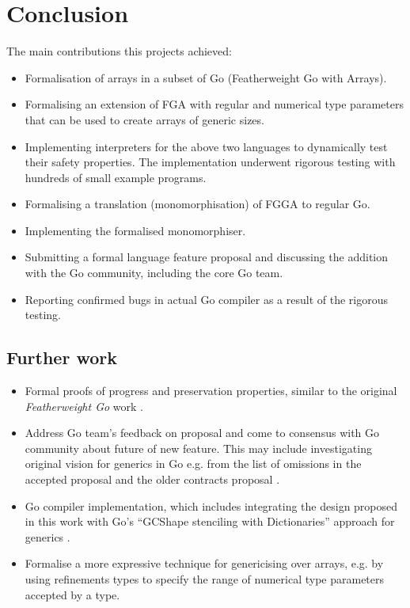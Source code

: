 \section{Conclusion}

The main contributions this projects achieved:

\begin{itemize}
      \item Formalisation of arrays in a subset of Go (Featherweight Go with
            Arrays).
      \item Formalising an extension of FGA with regular and numerical type
            parameters that can be used to create arrays of generic sizes.
      \item Implementing interpreters for the above two languages to dynamically
            test their safety properties. The implementation underwent rigorous
            testing with hundreds of small example programs.
      \item Formalising a translation (monomorphisation) of FGGA to regular Go.
      \item Implementing the formalised monomorphiser.
      \item Submitting a formal language feature proposal and discussing the
            addition with the Go community, including the core Go team.
      \item Reporting confirmed bugs in actual Go compiler as a result of the
            rigorous testing.
\end{itemize}

\subsection{Further work}

\begin{itemize}
      \item Formal proofs of progress and preservation properties, similar to the
            original \emph{Featherweight Go} work \autocite{fg}.
      \item Address Go team's feedback on proposal \autocite{myProposal} and come
            to consensus with Go community about future of new feature. This may
            include investigating original vision for generics in Go e.g. from the
            list of omissions in the accepted proposal \autocite{genericsProposal}
            and the older contracts proposal \autocite{contractsProposal}.
      \item Go compiler implementation, which includes integrating the design
            proposed in this work with Go's ``GCShape stenciling with
            Dictionaries'' approach for generics \autocite{generics1.18}.
      \item Formalise a more expressive technique for genericising over arrays,
            e.g. by using refinements types to specify the range of numerical
            type parameters accepted by a type.
\end{itemize}
